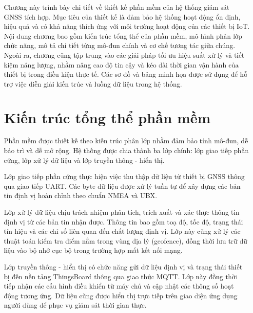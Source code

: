 \documentclass[../DoAn.tex]{subfiles}
\begin{document}
Chương này trình bày chi tiết về thiết kế phần mềm của hệ thống giám sát GNSS tích hợp. Mục tiêu của thiết kế là đảm bảo hệ thống hoạt động ổn định, hiệu quả và có khả năng thích ứng với môi trường hoạt động của các thiết bị IoT. Nội dung chương bao gồm kiến trúc tổng thể của phần mềm, mô hình phân lớp chức năng, mô tả chi tiết từng mô-đun chính và cơ chế tương tác giữa chúng. Ngoài ra, chương cũng tập trung vào các giải pháp tối ưu hiệu suất xử lý và tiết kiệm năng lượng, nhằm nâng cao độ tin cậy và kéo dài thời gian vận hành của thiết bị trong điều kiện thực tế. Các sơ đồ và bảng minh họa được sử dụng để hỗ trợ việc diễn giải kiến trúc và luồng dữ liệu trong hệ thống.
\section{Kiến trúc tổng thể phần mềm}
\label{section:4.1}
Phần mềm được thiết kế theo kiến trúc phân lớp nhằm đảm bảo tính mô-đun, dễ bảo trì và dễ mở rộng. Hệ thống được chia thành ba lớp chính: lớp giao tiếp phần cứng, lớp xử lý dữ liệu và lớp truyền thông - hiển thị.

Lớp giao tiếp phần cứng thực hiện việc thu thập dữ liệu từ thiết bị GNSS thông qua giao tiếp UART. Các byte dữ liệu được xử lý tuần tự để xây dựng các bản tin định vị hoàn chỉnh theo chuẩn NMEA và UBX.

Lớp xử lý dữ liệu chịu trách nhiệm phân tích, trích xuất và xác thực thông tin định vị từ các bản tin nhận được. Thông tin bao gồm toạ độ, tốc độ, trạng thái tín hiệu và các chỉ số liên quan đến chất lượng định vị. Lớp này cũng xử lý các thuật toán kiểm tra điểm nằm trong vùng địa lý (geofence), đồng thời lưu trữ dữ liệu vào bộ nhớ cục bộ trong trường hợp mất kết nối mạng.

Lớp truyền thông - hiển thị có chức năng gửi dữ liệu định vị và trạng thái thiết bị đến nền tảng ThingsBoard thông qua giao thức MQTT. Lớp này đồng thời tiếp nhận các cấu hình điều khiển từ máy chủ và cập nhật các thông số hoạt động tương ứng. Dữ liệu cũng được hiển thị trực tiếp trên giao diện ứng dụng người dùng để phục vụ giám sát thời gian thực.
\end{document}

